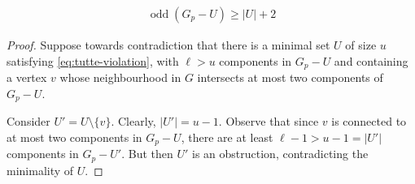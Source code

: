 \documentclass[10pt,a4paper]{amsart}
\newcommand{\odd}{\operatorname{odd}}
\begin{document}
\begin{align} \label{eq:tutte-violation}
    \odd(G_p - U) \geq |U|+2
\end{align}

\begin{proof}
Suppose towards contradiction that there is a minimal set $U$ of size $u$ satisfying \eqref{eq:tutte-violation}, with $\ell>u$ components in $G_p-U$ and containing a vertex $v$ whose neighbourhood in $G$ intersects at most two components of $G_p-U$.

Consider $U'=U \setminus \{v\}$. Clearly, $|U'|=u-1$. Observe that since $v$ is connected to at most two components in $G_p-U$, there are at least $\ell-1>u-1=|U'|$ components in $G_p-U'$. But then $U'$ is an obstruction, contradicting the minimality of $U$.
\end{proof}



\end{document}
